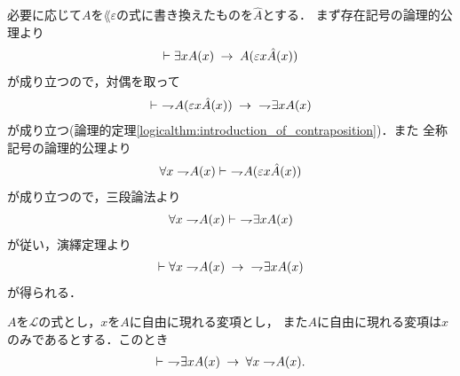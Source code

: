 	\begin{sketch}
		必要に応じて$A$を$\lang{\varepsilon}$の式に書き換えたものを$\hat{A}$とする．
		まず存在記号の論理的公理より
		\begin{align}
			\vdash \exists x A(x) \hspace{0.25em}\rightarrow\hspace{0.25em} A(\varepsilon x \hat{A}(x))
		\end{align}
		が成り立つので，対偶を取って
		\begin{align}
			\vdash\ \rightharpoondown\hspace{-0.25em} A(\varepsilon x \hat{A}(x)) 
			\hspace{0.25em}\rightarrow\hspace{0.25em}\ \rightharpoondown\hspace{-0.25em} \exists x A(x)
		\end{align}
		が成り立つ(論理的定理\ref{logicalthm:introduction_of_contraposition})．また
		全称記号の論理的公理より
		\begin{align}
			\forall x \rightharpoondown\hspace{-0.25em} A(x) \vdash\ \rightharpoondown\hspace{-0.25em} A(\varepsilon x \hat{A}(x))
		\end{align}
		が成り立つので，三段論法より
		\begin{align}
			\forall x \rightharpoondown\hspace{-0.25em} A(x) \vdash\ \rightharpoondown\hspace{-0.25em} \exists x A(x)
		\end{align}
		が従い，演繹定理より
		\begin{align}
			\vdash \forall x \rightharpoondown\hspace{-0.25em} A(x) \hspace{0.25em}\rightarrow\hspace{0.25em}\ \rightharpoondown\hspace{-0.25em} \exists x A(x)
		\end{align}
		が得られる．
		\QED
	\end{sketch}
	
	\begin{screen}
		\begin{logicalthm}
		\label{logicalthm:strong_De_Morgan_law_for_quantifiers_2}
			$A$を$\mathcal{L}$の式とし，$x$を$A$に自由に現れる変項とし，
			また$A$に自由に現れる変項は$x$のみであるとする．このとき
			\begin{align}
				\vdash\ \rightharpoondown\hspace{-0.25em} \exists x A(x) \hspace{0.25em}\rightarrow\hspace{0.25em} \forall x \rightharpoondown\hspace{-0.25em} A(x).
			\end{align}
		\end{logicalthm}
	\end{screen}
	
